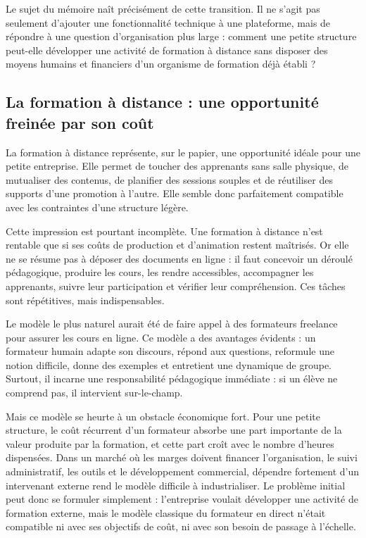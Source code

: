 \documentclass[12pt,a4paper]{article}
\begin{document}
Le sujet du mémoire naît précisément de cette transition. Il ne s'agit pas seulement
d'ajouter une fonctionnalité technique à une plateforme, mais de répondre à une question
d'organisation plus large : comment une petite structure peut-elle développer une activité
de formation à distance sans disposer des moyens humains et financiers d'un organisme de
formation déjà établi ?

\subsection{La formation à distance : une opportunité freinée par son coût}

La formation à distance représente, sur le papier, une opportunité idéale pour une petite
entreprise. Elle permet de toucher des apprenants sans salle physique, de mutualiser des
contenus, de planifier des sessions souples et de réutiliser des supports d'une promotion à
l'autre. Elle semble donc parfaitement compatible avec les contraintes d'une structure
légère.

Cette impression est pourtant incomplète. Une formation à distance n'est rentable que si
ses coûts de production et d'animation restent maîtrisés. Or elle ne se résume pas à
déposer des documents en ligne : il faut concevoir un déroulé pédagogique, produire les
cours, les rendre accessibles, accompagner les apprenants, suivre leur participation et
vérifier leur compréhension. Ces tâches sont répétitives, mais indispensables.

Le modèle le plus naturel aurait été de faire appel à des formateurs freelance pour
assurer les cours en ligne. Ce modèle a des avantages évidents : un formateur humain
adapte son discours, répond aux questions, reformule une notion difficile, donne des
exemples et entretient une dynamique de groupe. Surtout, il incarne une responsabilité
pédagogique immédiate : si un élève ne comprend pas, il intervient sur-le-champ.

Mais ce modèle se heurte à un obstacle économique fort. Pour une petite structure, le coût
récurrent d'un formateur absorbe une part importante de la valeur produite par la
formation, et cette part croît avec le nombre d'heures dispensées. Dans un marché où les
marges doivent financer l'organisation, le suivi administratif, les outils et le
développement commercial, dépendre fortement d'un intervenant externe rend le modèle
difficile à industrialiser. Le problème initial peut donc se formuler simplement :
l'entreprise voulait développer une activité de formation externe, mais le modèle
classique du formateur en direct n'était compatible ni avec ses objectifs de coût, ni avec
son besoin de passage à l'échelle.
\end{document}
